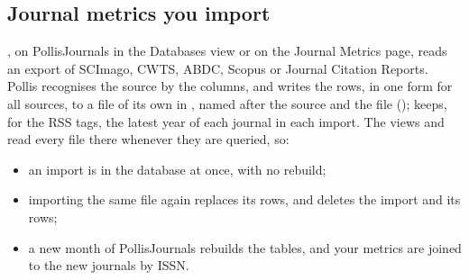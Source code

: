 \subsection{Journal metrics you import}\label{sec:your-metrics}
, on PollisJournals in the Databases view or on the Journal Metrics page, reads an
export of SCImago, CWTS, ABDC, Scopus or Journal Citation Reports. Pollis recognises the source by the columns,
and writes the rows, in one form for all sources, to a file of its own in , named
after the source and the file ();  keeps, for the
RSS tags, the latest year of each journal in each import. The views  and  read every file there
whenever they are queried, so:
\begin{itemize}
  \item an import is in the database at once, with no rebuild;
  \item importing the same file again replaces its rows, and  deletes the import and its rows;
  \item a new month of PollisJournals rebuilds the tables, and your metrics are joined to the new journals by ISSN.
\end{itemize}

